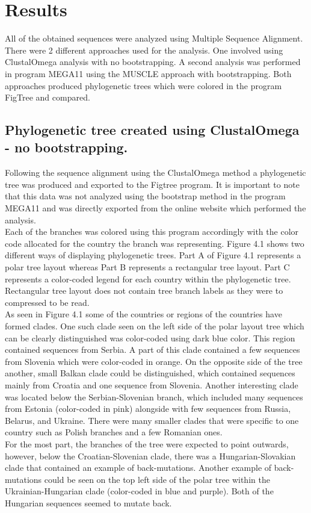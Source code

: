\chapter{Results}

All of the obtained sequences were analyzed using Multiple Sequence Alignment. 
There were 2 different approaches used for the analysis. 
One involved using ClustalOmega analysis with no bootstrapping.
A second analysis was performed in program MEGA11 using the MUSCLE approach with bootstrapping.  
Both approaches produced phylogenetic trees which were colored in the program FigTree and compared.

\section{Phylogenetic tree created using ClustalOmega - no bootstrapping.}

Following the sequence alignment using the ClustalOmega method a phylogenetic tree was produced and exported to the Figtree program. 
It is important to note that this data was not analyzed using the bootstrap method in the program MEGA11 and was directly exported from the online website which performed the analysis. \\
Each of the branches was colored using this program accordingly with the color code allocated for the country the branch was representing. 
Figure 4.1 shows two different ways of displaying phylogenetic trees. 
Part A of Figure 4.1 represents a polar tree layout whereas Part B represents a rectangular tree layout. 
Part C represents a color-coded legend for each country within the phylogenetic tree. 
Rectangular tree layout does not contain tree branch labels as they were to compressed to be read.\\
As seen in Figure 4.1 some of the countries or regions of the countries have formed clades. 
One such clade seen on the left side of the polar layout tree which can be clearly distinguished was color-coded using dark blue color. 
This region contained sequences from Serbia. 
A part of this clade contained a few sequences from Slovenia which were color-coded in orange. 
On the opposite side of the tree another, small Balkan clade could be distinguished, which contained sequences mainly from Croatia and one sequence from Slovenia. 
Another interesting clade was located below the Serbian-Slovenian branch, which included many sequences from Estonia (color-coded in pink) alongside with few sequences from Russia,  Belarus, and Ukraine. 
There were many smaller clades that were specific to one country such as Polish branches and a few Romanian ones. \\
For the most part, the branches of the tree were expected to point outwards, however, below the Croatian-Slovenian clade, there was a Hungarian-Slovakian clade that contained an example of back-mutations. 
Another example of back-mutations could be seen on the top left side of the polar tree within the Ukrainian-Hungarian clade (color-coded in blue and purple). 
Both of the Hungarian sequences seemed to mutate back.

